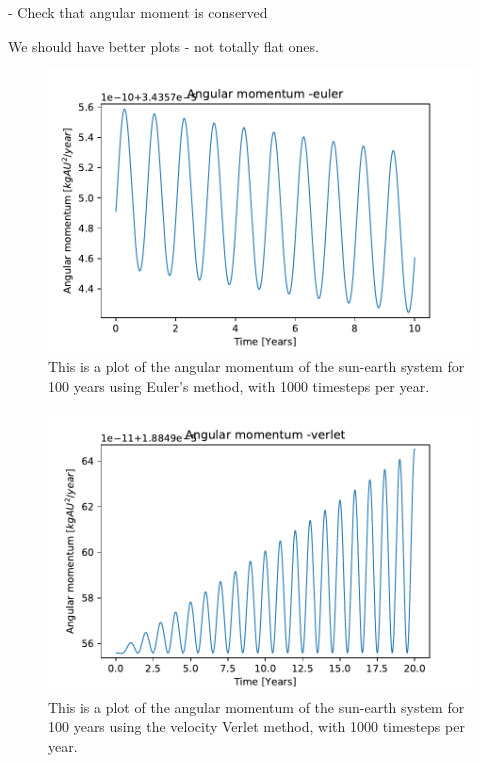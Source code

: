 	- Check that angular moment is conserved

We should have better plots - not totally flat ones.

\begin{figure}[H]
\includegraphics[width=1.1\linewidth]{../results/plots/angularmomentum-euler.pdf}\caption{This is a plot of the angular momentum of the sun-earth system for 100 years using Euler's method, with 1000 timesteps per year.}\label{fig:angluarmomentum-euler}
\end{figure}	

\begin{figure}[H]
\includegraphics[width=1.1\linewidth]{../results/plots/angularmomentum-verlet.pdf}\caption{This is a plot of the angular momentum of the sun-earth system for 100 years using the velocity Verlet method, with 1000 timesteps per year.}\label{fig:angularmomentum-verlet}
\end{figure}	

